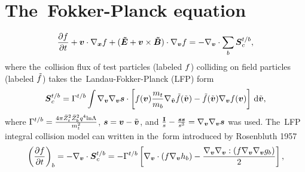 \documentclass[preprint,12pt]{elsarticle}
\begin{document}
 \linenumbers
\pagebreak
\tableofcontents
\pagebreak
\section{The~Fokker-Planck equation}
\label{sed:FP}
\begin{equation}
  \frac{\partial{f}}{\partial{t}} + \boldsymbol{v}\cdot\nabla_{\boldsymbol{x}} f + (\boldsymbol{\tilde{E}} + \boldsymbol{v}\times\boldsymbol{\tilde{B}}) \cdot\nabla_{\boldsymbol{v}} f =
  - \nabla_{\boldsymbol{v}} \cdot \sum_{b}\boldsymbol{S}_c^{t/b} ,
  \nonumber
\end{equation}
where the~collision flux of test particles (labeled $f$) colliding on field
particles (labeled $\tilde{f}$) takes the~Landau-Fokker-Planck (LFP) form
\begin{equation}
  \boldsymbol{S}_c^{t/b} = \Gamma^{t/b}\int \nabla_{\boldsymbol{v}}\nabla_{\boldsymbol{v}}\boldsymbol{s} \cdot \left[ 
  f(\boldsymbol{v})\frac{m_t}{m_b}\nabla_{\tilde{\boldsymbol{v}}} \tilde{f}(\tilde{\boldsymbol{v}}) - \tilde{f}(\tilde{\boldsymbol{v}})\nabla_{\boldsymbol{v}} f(\boldsymbol{v})
  \right]\, \text{d}\tilde{\boldsymbol{v}} , \nonumber 
  \nonumber
\end{equation} 
where $\Gamma^{t/b} = \frac{4\pi\bar{Z}_t^2\bar{Z}_b^2 q^4 \text{ln}\Lambda}{m_t^2}$, $\boldsymbol{s} = \boldsymbol{v} - \tilde{\boldsymbol{v}}$, and 
$\frac{\mathbf{I}}{s} - \frac{\boldsymbol{s}\boldsymbol{s}}{s^3} = \nabla_{\boldsymbol{v}}\nabla_{\boldsymbol{v}}\boldsymbol{s}$ was used.
The~LFP integral collision model can written in the~form introduced by 
Rosenbluth 1957
\begin{equation}
  \left(\pdv{\ft}{t}\right)_{\pb} = - \gv \cdot \vect{S}_c^{\tob} = 
  - \Gamma^{\tob} \left[ \gv\cdot\left(\ft \gv\Rhb\right)
  - \frac{\gv\gv:\left(\ft \gv\gv\Rgb \right)}{2}\right] ,
  \label{eq:FP_Rosenbluth}
\end{equation}
\end{document}
